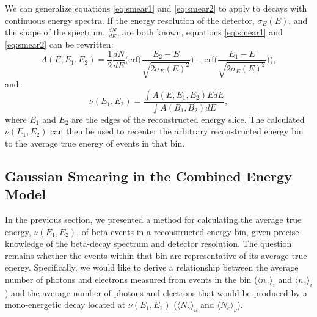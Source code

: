 We can generalize equations \ref{eq:smear1} and \ref{eq:smear2} to apply to decays with continuous energy spectra. If the energy resolution of the detector, $\sigma_E(E)$, and the shape of the spectrum, $\frac{dN}{dE}$, are both known, equations \ref{eq:smear1} and \ref{eq:smear2} can be rewritten:
\begin{equation}\label{eq:smear3}
A(E;E_1,E_2)=\frac{1}{2}\frac{dN}{dE} \Bigg(\text{erf} \bigg(\frac{E_2-E}{\sqrt{2\sigma_E(E)^2}}\bigg)-\text{erf}\bigg(\frac{E_1-E}{\sqrt{2\sigma_E(E)^2}}\bigg)\Bigg),
\end{equation}
and:
\begin{equation}\label{eq:smear4}
\nu(E_1,E_2)=\frac{\int A(E,E_1,E_2)EdE}{\int A(B_1,B_2)dE},
\end{equation}
where $E_1$ and $E_2$ are the edges of the reconstructed energy slice. The calculated $\nu(E_1,E_2)$ can then be used to recenter the arbitrary reconstructed energy bin to the average true energy of events in that bin.

\subsection{Gaussian Smearing in the Combined Energy Model}\label{sec:gaussmear}
In the previous section, we presented a method for calculating the average true energy, $\nu(E_1,E_2)$, of beta-events in a reconstructed energy bin, given precise knowledge of the beta-decay spectrum and detector resolution. The question remains whether the events within that bin are representative of its average true energy. Specifically, we would like to derive a relationship between the average number of photons and electrons measured from events in the bin ($\langle n_{\gamma}\rangle_i$ and $\langle n_{e} \rangle_i$) and the average number of photons and electrons that would be produced by a mono-energetic decay located at $\nu(E_1,E_2)$ ($\langle N_{\gamma} \rangle_{\nu}$ and $\langle N_{e} \rangle_{\nu}$). 

